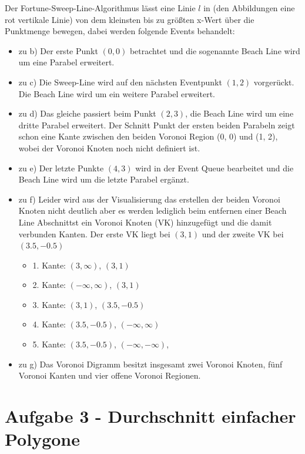 \documentclass[a4paper]{article}
\begin{document}
\begin{figure}[!htb]
\end{figure} 


Der Fortune-Sweep-Line-Algorithmus lässt eine Linie $l$ in (den Abbildungen eine rot vertikale Linie) von dem kleinsten bis zu größten x-Wert über die Punktmenge bewegen, dabei werden folgende Events behandelt:

\begin{itemize}
	\item zu b) Der erste Punkt $(0, 0)$ betrachtet und die sogenannte Beach Line wird um eine Parabel erweitert.
	\item zu c) Die Sweep-Line wird auf den nächsten Eventpunkt $(1, 2)$ vorgerückt. Die Beach Line wird um ein weitere Parabel erweitert.
	\item zu d) Das gleiche passiert beim Punkt $(2, 3)$, die Beach Line wird um eine dritte Parabel erweitert. Der Schnitt Punkt der ersten beiden Parabeln zeigt schon eine Kante zwischen den beiden Voronoi Region (0, 0) und (1, 2), wobei der Voronoi Knoten noch nicht definiert ist.
	\item zu e) Der letzte Punkte $(4, 3)$ wird in der Event Queue bearbeitet und die Beach Line wird um die letzte Parabel ergänzt.
	\item zu f) Leider wird aus der Visualisierung das erstellen der beiden Voronoi Knoten nicht deutlich aber es werden lediglich beim entfernen einer Beach Line Abschnittst ein Voronoi Knoten (VK) hinzugefügt und die damit verbunden Kanten. Der erste VK liegt bei $(3, 1)$ und der zweite VK bei $(3.5, -0.5)$
	\begin{itemize}
		\item	1. Kante: $(3, \infty)$, $(3, 1)$
		\item	2. Kante: $(-\infty, \infty)$, $(3, 1)$
		\item	3. Kante: $(3, 1)$, $(3.5, -0.5)$
		\item	4. Kante: $(3.5, -0.5)$, $(-\infty, \infty)$
		\item	5. Kante: $(3.5, -0.5)$, $(-\infty, -\infty)$, 
	\end{itemize}
	\item zu g) Das Voronoi Digramm besitzt insgesamt zwei Voronoi Knoten, fünf Voronoi Kanten und vier offene Voronoi Regionen.
\end{itemize}


\section*{Aufgabe 3 - Durchschnitt einfacher Polygone}

\end{document}
